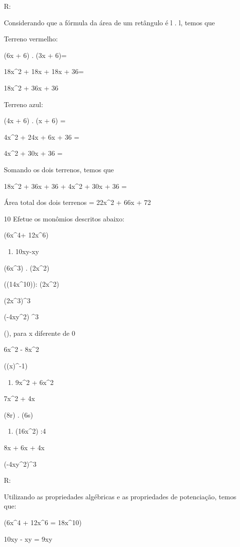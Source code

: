 {R:

Considerando que a fórmula da área de um retângulo é l . l, temos que

Terreno vermelho:

(6x + 6) . (3x + 6)=

18x^2 + 18x + 18x + 36=

18x^2 + 36x + 36

Terreno azul:

(4x + 6) . (x + 6) =

4x^2 + 24x + 6x + 36 =

4x^2 + 30x + 36 =

Somando os dois terrenos, temos que

18x^2 + 36x + 36 + 4x^2 + 30x + 36 =

Área total dos dois terrenos = 22x^2 + 66x + 72

\num{10} Efetue os monômios descritos abaixo:
\item (6x^4+ 12x^6)

\begin{enumerate}
\def\labelenumi{\alph{enumi})}
\setcounter{enumi}{1}
\tightlist
\item
  10xy-xy
\end{enumerate}
\item(6x^3) . (2x^2)
\item ((14x^{10})): (2x^2)
\item (2x^3)^3
\item (-4xy^2) ^3
\item (), para x diferente de 0
\item 6x^2 - 8x^2
\item((x)^{-1})

\begin{enumerate}
\def\labelenumi{\alph{enumi})}
\setcounter{enumi}{9}
\tightlist
\item
  9x^2 + 6x^2
\end{enumerate}
\item 7x^2 + 4x
\item (8r) . (6s)

\begin{enumerate}
\def\labelenumi{\alph{enumi})}
\setcounter{enumi}{12}
\tightlist
\item
  (16x^2) :4
\end{enumerate}
\item 8x + 6x + 4x
\item (-4xy^2)^3

R:

Utilizando as propriedades algébricas e as propriedades de potenciação,
temos que:
\item (6x^4 + 12x^6 = 18x^{10})
\item 10xy - xy = 9xy

}
